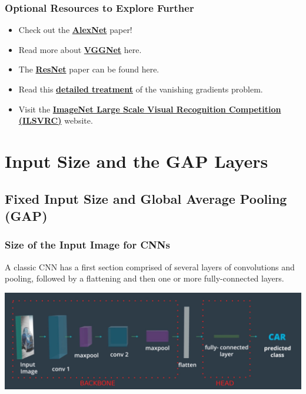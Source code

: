 \subsubsection{Optional Resources to Explore Further}

\begin{itemize}
    \item Check out the \href{http://papers.nips.cc/paper/4824-imagenet-classification-with-deep-convolutional-neural-networks.pdf}{\textbf{AlexNet}} paper!
    \item Read more about \href{https://arxiv.org/pdf/1409.1556.pdf}{\textbf{VGGNet}} here.
    \item The \href{https://arxiv.org/pdf/1512.03385v1.pdf}{\textbf{ResNet}} paper can be found here.
    \item Read this \href{http://neuralnetworksanddeeplearning.com/chap5.html}{\textbf{detailed treatment}} of the vanishing gradients problem.
    \item Visit the \href{http://www.image-net.org/challenges/LSVRC/}{\textbf{ImageNet Large Scale Visual Recognition Competition (ILSVRC)}} website.
\end{itemize}

\section{Input Size and the GAP Layers}

\subsection{Fixed Input Size and Global Average Pooling (GAP)}

\subsubsection{Size of the Input Image for CNNs}

A classic CNN has a first section comprised of several layers of convolutions and pooling, followed by a flattening and then one or more fully-connected layers.

\includegraphics[width=1\linewidth]{img//cnn//transfer/cnn-structure-complete.jpeg}

